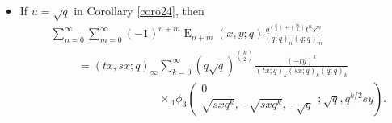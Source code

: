 \documentclass{cimart}
\DeclareMathOperator{\opE}{E}
\begin{document}
\begin{itemize}
    \item 
If $u=\sqrt{q}$ in Corollary \ref{coro24}, then
    \begin{align}
    &\sum_{n=0}^{\infty}\sum_{m=0}^{\infty}(-1)^{n+m}\opE_{n+m}(x,y;q)\frac{q^{\binom{n}{2}+\binom{m}{2}}t^{n}s^{m}}{(q;q)_{n}(q;q)_{m}}\nonumber\\
        &\hspace{1cm}=(tx,sx;q)_{\infty}\sum_{k=0}^{\infty}(q\sqrt{q})^{\binom{k}{2}}\frac{(-ty)^k}{(tx;q)_{k}(sx;q)_{k}(q;q)_{k}}\nonumber\\
        &\hspace{4cm}\times{}_{1}\phi_{3}\left(
        \begin{array}{c}
             0 \\
             \sqrt{sxq^k},-\sqrt{sxq^k},-\sqrt{q}
        \end{array};
        \sqrt{q},q^{k/2}sy
        \right).
\end{align}
\end{itemize}





\end{document}
